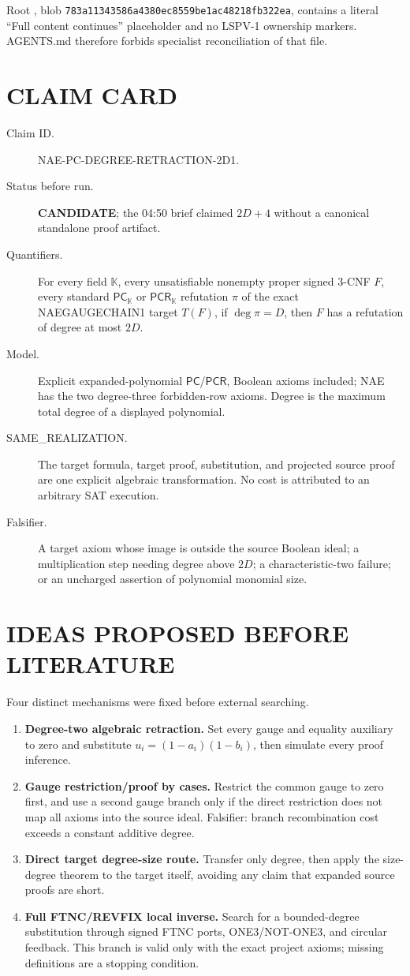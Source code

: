 \documentclass[11pt]{article}
\newcommand{\PC}{\ensuremath{\mathsf{PC}}}
\newcommand{\PCR}{\ensuremath{\mathsf{PCR}}}
\newcommand{\CAND}{\textbf{CANDIDATE}}
\begin{document}
Root , blob
\texttt{783a11343586a4380ec8559be1ac48218fb322ea}, contains a literal
``Full content continues'' placeholder and no LSPV-1 ownership markers.
AGENTS.md therefore forbids specialist reconciliation of that file.

\section{CLAIM CARD}
\begin{description}
\item[Claim ID.] NAE-PC-DEGREE-RETRACTION-2D1.
\item[Status before run.] \CAND{}; the 04:50 brief claimed $2D+4$ without a
canonical standalone proof artifact.
\item[Quantifiers.] For every field $\mathbb K$, every unsatisfiable nonempty
proper signed 3-CNF $F$, every standard \PC$_\mathbb K$ or
\PCR$_\mathbb K$ refutation $\pi$ of the exact NAEGAUGECHAIN1 target $T(F)$,
if $\deg\pi=D$, then $F$ has a refutation of degree at most $2D$.
\item[Model.] Explicit expanded-polynomial \PC/\PCR, Boolean axioms included;
NAE has the two degree-three forbidden-row axioms.  Degree is the maximum
total degree of a displayed polynomial.
\item[SAME\_REALIZATION.] The target formula, target proof, substitution,
and projected source proof are one explicit algebraic transformation.  No
cost is attributed to an arbitrary SAT execution.
\item[Falsifier.] A target axiom whose image is outside the source Boolean
ideal; a multiplication step needing degree above $2D$; a characteristic-two
failure; or an uncharged assertion of polynomial monomial size.
\end{description}

\section{IDEAS PROPOSED BEFORE LITERATURE}
Four distinct mechanisms were fixed before external searching.
\begin{enumerate}
\item \textbf{Degree-two algebraic retraction.}  Set every gauge and equality
auxiliary to zero and substitute
$u_i=(1-a_i)(1-b_i)$, then simulate every proof inference.
\item \textbf{Gauge restriction/proof by cases.}  Restrict the common gauge
to zero first, and use a second gauge branch only if the direct restriction
does not map all axioms into the source ideal.  Falsifier: branch recombination
cost exceeds a constant additive degree.
\item \textbf{Direct target degree-size route.}  Transfer only degree, then
apply the size-degree theorem to the target itself, avoiding any claim that
expanded source proofs are short.
\item \textbf{Full FTNC/REVFIX local inverse.}  Search for a bounded-degree
substitution through signed FTNC ports, ONE3/NOT-ONE3, and circular feedback.
This branch is valid only with the exact project axioms; missing definitions
are a stopping condition.
\end{enumerate}
\end{document}
